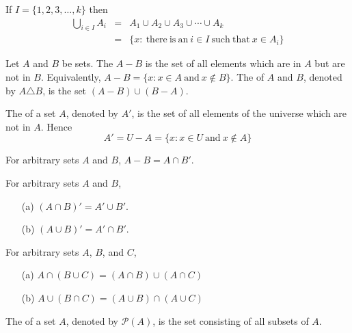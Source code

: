 \begin{definition}
  If $I = \{1, 2, 3, \dots, k\}$ then
  \begin{eqnarray*}
  \bigcup_{i \in I} A_i & = & A_1 \cup A_2 \cup A_3 \cup \cdots \cup A_k \\
  & = & \{x :\ \mathrm{there\ is\ an}\ i \in I\ \mathrm{such\ that}\ x \in A_i\}
  \end{eqnarray*}
\end{definition}

\begin{definition}
  Let $A$ and $B$ be sets. The  $A - B$ is the set of all elements which are in $A$ but are not in $B$. Equivalently, $A - B = \{x : x \in A\ \mathrm{and}\ x \not\in B\}$. The  of $A$ and $B$, denoted by $A \triangle B$, is the set $(A - B) \cup (B - A)$.
\end{definition}

\begin{definition}
  The  of a set $A$, denoted by $A'$, is the set of all elements of the universe which are not in $A$. Hence
  \[A' = U - A = \{x : x \in U\ \mathrm{and}\ x \not\in A\}\]
\end{definition}

\begin{theorem}
  For arbitrary sets $A$ and $B$, $A - B = A \cap B'$.
\end{theorem}

\begin{theorem}
  For arbitrary sets $A$ and $B$,
  \begin{enumerate}
    \item[(a)] $(A \cap B)' = A' \cup B'$.
    \item[(b)] $(A \cup B)' = A' \cap B'$.
  \end{enumerate}
\end{theorem}

\begin{theorem}
  For arbitrary sets $A$, $B$, and $C$,
  \begin{enumerate}
    \item[(a)] $A \cap (B \cup C) = (A \cap B) \cup (A \cap C)$
    \item[(b)] $A \cup (B \cap C) = (A \cup B) \cap (A \cup C)$
  \end{enumerate}
\end{theorem}

\begin{definition}
  The  of a set $A$, denoted by $\mathcal{P}(A)$, is the set consisting of all subsets of $A$.
\end{definition}


